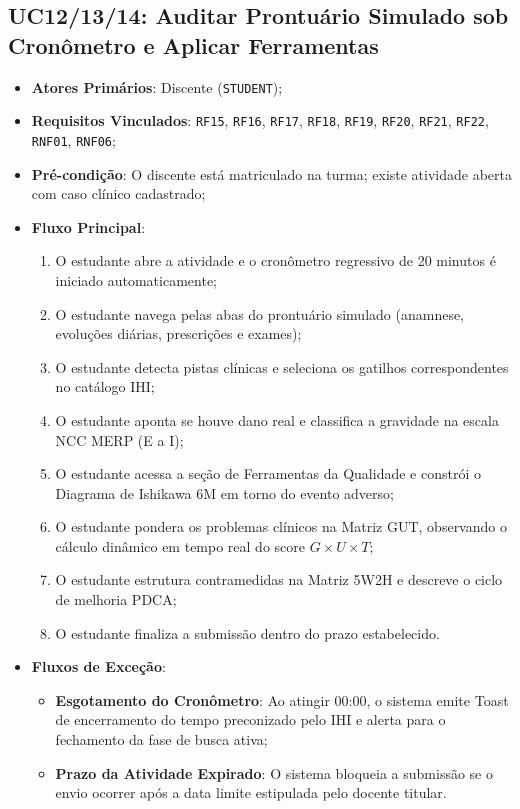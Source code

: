 \subsection{UC12/13/14: Auditar Prontuário Simulado sob Cronômetro e Aplicar Ferramentas}
\label{sub_uc12_14}
\begin{itemize}
    \item \textbf{Atores Primários}: Discente (\texttt{STUDENT});
    \item \textbf{Requisitos Vinculados}: \texttt{RF15}, \texttt{RF16}, \texttt{RF17}, \texttt{RF18}, \texttt{RF19}, \texttt{RF20}, \texttt{RF21}, \texttt{RF22}, \texttt{RNF01}, \texttt{RNF06};
    \item \textbf{Pré-condição}: O discente está matriculado na turma; existe atividade aberta com caso clínico cadastrado;
    \item \textbf{Fluxo Principal}:
    \begin{enumerate}
        \item O estudante abre a atividade e o cronômetro regressivo de 20 minutos é iniciado automaticamente;
        \item O estudante navega pelas abas do prontuário simulado (anamnese, evoluções diárias, prescrições e exames);
        \item O estudante detecta pistas clínicas e seleciona os gatilhos correspondentes no catálogo IHI;
        \item O estudante aponta se houve dano real e classifica a gravidade na escala NCC MERP (E a I);
        \item O estudante acessa a seção de Ferramentas da Qualidade e constrói o Diagrama de Ishikawa 6M em torno do evento adverso;
        \item O estudante pondera os problemas clínicos na Matriz GUT, observando o cálculo dinâmico em tempo real do score $G \times U \times T$;
        \item O estudante estrutura contramedidas na Matriz 5W2H e descreve o ciclo de melhoria PDCA;
        \item O estudante finaliza a submissão dentro do prazo estabelecido.
    \end{enumerate}
    \item \textbf{Fluxos de Exceção}:
    \begin{itemize}
        \item \textbf{Esgotamento do Cronômetro}: Ao atingir 00:00, o sistema emite Toast de encerramento do tempo preconizado pelo IHI e alerta para o fechamento da fase de busca ativa;
        \item \textbf{Prazo da Atividade Expirado}: O sistema bloqueia a submissão se o envio ocorrer após a data limite estipulada pelo docente titular.
    \end{itemize}
\end{itemize}

